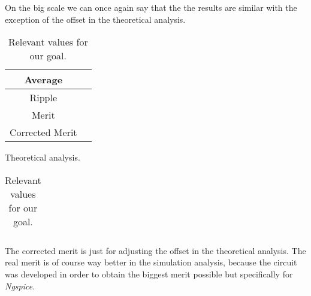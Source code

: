 On the big scale we can once again say that the the results are similar with the exception of the offset in the theoretical analysis.

\begin{table}[H]
    \begin{minipage}{.5\textwidth}
    \centering
    \begin{tabular}{|c|c|}
          \hline
          Average & \\
          \hline
          Ripple & \\
          \hline
          Merit &  \\
          \hline
          Corrected Merit & \\
          \hline
    \end{tabular}
    \caption{Theoretical analysis.}
    \end{minipage}
    \begin{minipage}{.5\textwidth}
        \begin{table}[H]
        \centering
        \begin{tabular}{|c|c|}
              \hline
              
              \hline
        \end{tabular}
        \caption{Simulation analysis}
        \label{tab:fresnel2}
    \end{table}
    \end{minipage}
    \caption{Relevant values for our goal.} 
\end{table}

The corrected merit is just for adjusting the offset in the theoretical analysis. The real merit is of course way better in the simulation  analysis, because the circuit was developed in order to obtain the biggest merit possible but specifically for \textit{Ngspice}.